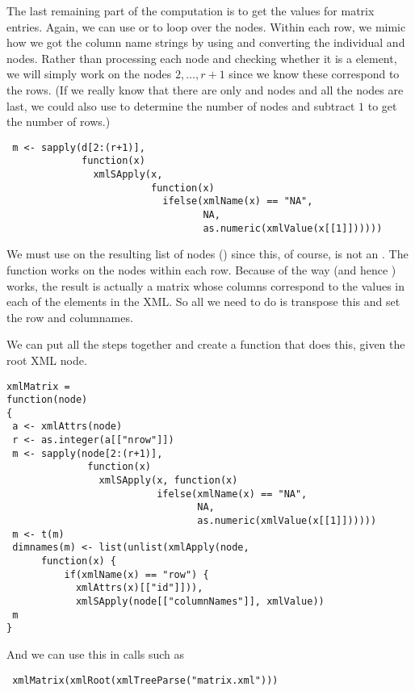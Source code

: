 The last remaining part of the computation is to get the values for
matrix entries.  Again, we can use  or
 to loop over the  nodes.  Within each
row, we mimic how we got the column name strings by using
 and converting the individual  and
 nodes.  Rather than processing each node and checking
whether it is a  element, we will simply work on the nodes
$2, \ldots, r+1$ since we know these correspond to the rows.
(If we really know that there are only 
and  nodes and all the  nodes are last,
we could also use  to determine the number
of nodes and subtract $1$ to get the number of rows.)
\begin{verbatim}
 m <- sapply(d[2:(r+1)], 
             function(x) 
               xmlSApply(x, 
                         function(x) 
                           ifelse(xmlName(x) == "NA", 
                                  NA, 
                                  as.numeric(xmlValue(x[[1]])))))
\end{verbatim}
We must use  on the resulting list of nodes
() since this, of course, is not an
.  The function works on the nodes within each row.
Because of the way  (and hence )
works, the result is actually a matrix whose columns correspond to the
values in each of the  elements in the XML.
So all we need to do is transpose this
and set the row and columnames.

We can put all the steps together and create
a function that does this, given the root XML node.
\begin{verbatim}
xmlMatrix =
function(node)
{
 a <- xmlAttrs(node)
 r <- as.integer(a[["nrow"]])
 m <- sapply(node[2:(r+1)], 
              function(x) 
                xmlSApply(x, function(x) 
                          ifelse(xmlName(x) == "NA", 
                                 NA, 
                                 as.numeric(xmlValue(x[[1]])))))
 m <- t(m)
 dimnames(m) <- list(unlist(xmlApply(node, 
      function(x) {
          if(xmlName(x) == "row") {
            xmlAttrs(x)[["id"]])), 
            xmlSApply(node[["columnNames"]], xmlValue))
 m
}
\end{verbatim}
And we can use this in calls
such as 
\begin{verbatim}
 xmlMatrix(xmlRoot(xmlTreeParse("matrix.xml")))
\end{verbatim}

